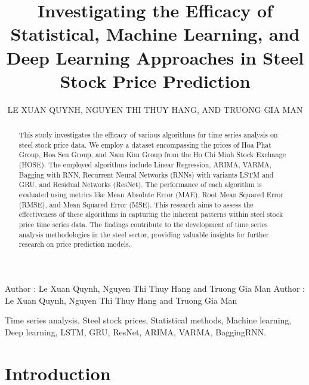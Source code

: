 \documentclass{ieeeojies}
\begin{document}
\title{Investigating the Efficacy of Statistical, Machine Learning, and Deep Learning Approaches in Steel Stock Price Prediction}

\author{\uppercase{Le Xuan Quynh},
\uppercase{Nguyen Thi Thuy Hang, and Truong Gia Man}}

\address[1]{Faculty of Information Systems, University of Information Technology, (e-mail: 21520430@gm.uit.edu.vn)}
\address[2]{Faculty of Information Systems, University of Information Technology, (e-mail: 21520822@gm.uit.edu.vn)}
\address[3]{Faculty of Information Systems, University of Information Technology, (e-mail: 21521115@gm.uit.edu.vn)}

\markboth
{Author \headeretal: Le Xuan Quynh, Nguyen Thi Thuy Hang and Truong Gia Man}
{Author \headeretal: Le Xuan Quynh, Nguyen Thi Thuy Hang and Truong Gia Man}

\begin{abstract}
This study investigates the efficacy of various algorithms for time series analysis on steel stock price data. We employ a dataset encompassing the prices of Hoa Phat Group, Hoa Sen Group, and Nam Kim Group from the Ho Chi Minh Stock Exchange (HOSE). The employed algorithms include Linear Regression, ARIMA, VARMA, Bagging with RNN, Recurrent Neural Networks (RNNs) with variants LSTM and GRU, and Residual Networks (ResNet). The performance of each algorithm is evaluated using metrics like Mean Absolute Error (MAE), Root Mean Squared Error (RMSE), and Mean Squared Error (MSE). This research aims to assess the effectiveness of these algorithms in capturing the inherent patterns within steel stock price time series data. The findings contribute to the development of time series analysis methodologies in the steel sector, providing valuable insights for further research on price prediction models.
\end{abstract}

\begin{keywords}
 Time series analysis, Steel stock prices, Statistical methods, Machine learning, Deep learning, LSTM, GRU, ResNet, ARIMA, VARMA, BaggingRNN.
\end{keywords}

\titlepgskip=-15pt

\maketitle

\section{Introduction}
\label{sec:introduction}
\end{document}
